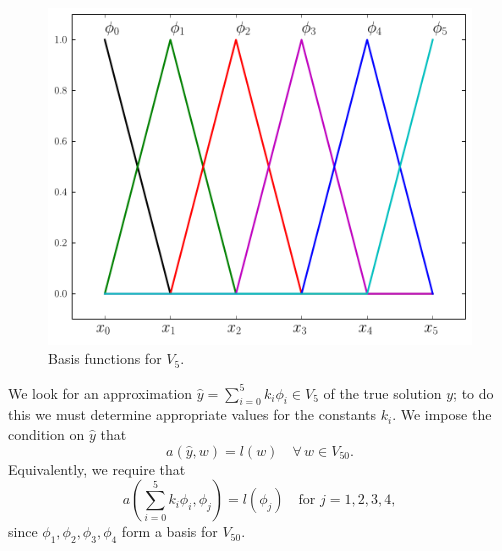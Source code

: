 \begin{figure}[ht]
\centering
\includegraphics[width=\textwidth]{basis_functions.pdf}
\caption{Basis functions for $V_5$.}
\label{FEM:basis_functions}
\end{figure}

We look for an approximation $\hat{y} = \sum_{i=0}^5 k_i \phi_i \in V_5$ of the true solution $y$; to do this we must determine appropriate values for the constants $k_i$. We impose the condition on $\hat{y}$ that 
\[a(\hat{y},w) = l(w) \quad \forall \, w \in V_{50}.\]
Equivalently, we require that 
\[a \left( \sum_{i=0}^5 k_i \phi_i,\phi_j \right) = l(\phi_j) \quad \text{for } j = 1,2,3,4,\]
since $\phi_1, \phi_2, \phi_3, \phi_4$ form a basis for $V_{50}$.


